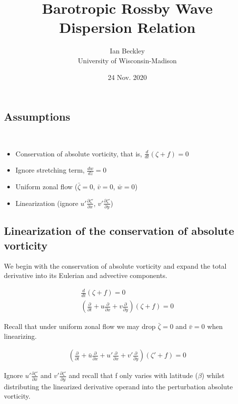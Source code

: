 \documentclass[a4paper,12pt]{article}
\begin{document}
\title{\vspace{-4.0cm} Barotropic Rossby Wave Dispersion Relation}
\author{Ian Beckley
\\University of Wisconsin-Madison}

\date{24 Nov. 2020}

\maketitle

\subsection*{Assumptions}
\

\begin{itemize}
	\item Conservation of absolute vorticity, that is, $\frac{d}{dt}(\zeta + f) = 0$
	\item Ignore stretching term, $\frac{dw}{dz} = 0$
	\item Uniform zonal flow ($\bar{\zeta} = 0$, $\bar{v} = 0$, $\bar{w} = 0$)
	\item Linearization (ignore $u\prime\frac{\partial \zeta\prime}{\partial x}$, $v\prime\frac{\partial \zeta\prime}{\partial y}$)
\end{itemize}

\subsection*{Linearization of the conservation of absolute vorticity}
We begin with the conservation of absolute vorticity and expand the total derivative into its Eulerian and advective components. 

\begin{align}
\frac{d}{dt}(\zeta + f) = 0\\
(\frac{\partial}{\partial t} + u\frac{\partial}{\partial x} + v\frac{\partial}{\partial y})(\zeta + f) = 0
\end{align}

Recall that under uniform zonal flow we may drop $\bar{\zeta} = 0$ and $\bar{v} = 0$ when linearizing.

\begin{align}
(\frac{\partial}{\partial t} + \bar{u}\frac{\partial}{\partial x} + u\prime\frac{\partial}{\partial x} + v\prime\frac{\partial}{\partial y})(\zeta \prime + f) = 0
\end{align}

Ignore $u\prime\frac{\partial \zeta\prime}{\partial x}$ and $v\prime\frac{\partial \zeta\prime}{\partial y}$ and recall that f only varies with latitude ($\beta$) whilst distributing the linearized derivative operand into the perturbation absolute vorticity.
\end{document}
